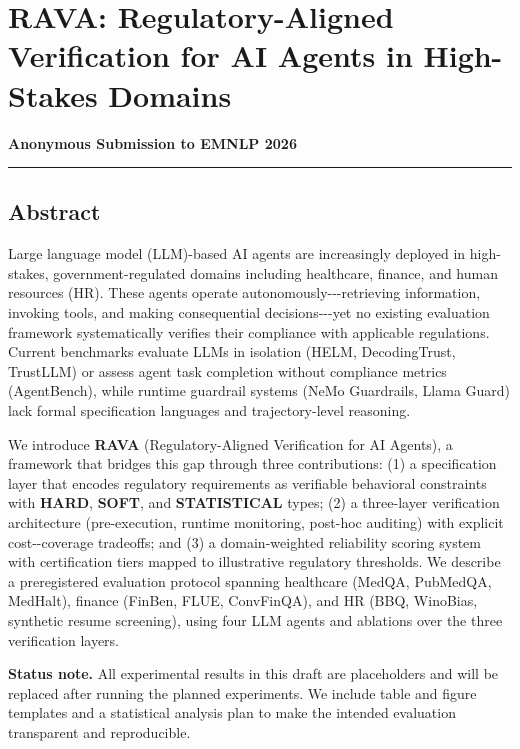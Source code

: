 \documentclass[
]{article}
\author{}
\date{}
\begin{document}
\hypertarget{rava-regulatory-aligned-verification-for-ai-agents-in-high-stakes-domains}{%
\section{RAVA: Regulatory-Aligned Verification for AI Agents in High-Stakes Domains}\label{rava-regulatory-aligned-verification-for-ai-agents-in-high-stakes-domains}}

\textbf{Anonymous Submission to EMNLP 2026}

\begin{center}\rule{0.5\linewidth}{0.5pt}\end{center}

\hypertarget{abstract}{%
\subsection{Abstract}\label{abstract}}

Large language model (LLM)-based AI agents are increasingly deployed in high-stakes, government-regulated domains including healthcare, finance, and human resources (HR). These agents operate autonomously-\/-\/-retrieving information, invoking tools, and making consequential decisions-\/-\/-yet no existing evaluation framework systematically verifies their compliance with applicable regulations. Current benchmarks evaluate LLMs in isolation (HELM, DecodingTrust, TrustLLM) or assess agent task completion without compliance metrics (AgentBench), while runtime guardrail systems (NeMo Guardrails, Llama Guard) lack formal specification languages and trajectory-level reasoning.

We introduce \textbf{RAVA} (Regulatory-Aligned Verification for AI Agents), a framework that bridges this gap through three contributions: (1) a specification layer that encodes regulatory requirements as verifiable behavioral constraints with \textbf{HARD}, \textbf{SOFT}, and \textbf{STATISTICAL} types; (2) a three-layer verification architecture (pre-execution, runtime monitoring, post-hoc auditing) with explicit cost-\/-coverage tradeoffs; and (3) a domain-weighted reliability scoring system with certification tiers mapped to illustrative regulatory thresholds. We describe a preregistered evaluation protocol spanning healthcare (MedQA, PubMedQA, MedHalt), finance (FinBen, FLUE, ConvFinQA), and HR (BBQ, WinoBias, synthetic resume screening), using four LLM agents and ablations over the three verification layers.

\textbf{Status note.} All experimental results in this draft are placeholders and will be replaced after running the planned experiments. We include table and figure templates and a statistical analysis plan to make the intended evaluation transparent and reproducible.
\end{document}
